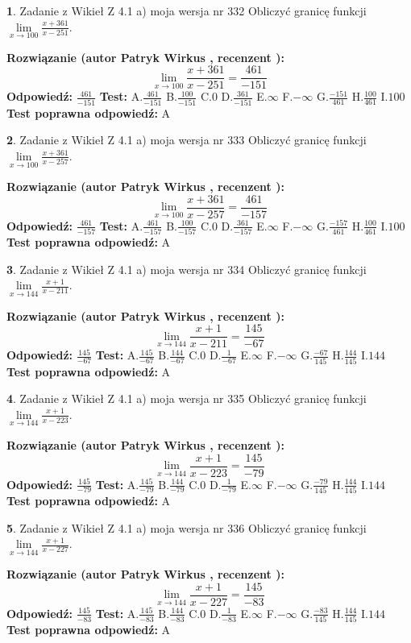 \documentclass[12pt, a4paper]{article}
\theoremstyle{definition} %
\newtheorem{zad}{}
\newcommand{\zadStart}[1]{\begin{zad}#1\newline}
\newcommand{\zadStop}{\end{zad}}
\newcommand{\rozwStart}[2]{\noindent \textbf{Rozwiązanie (autor #1 , recenzent #2): }\newline}
\newcommand{\rozwStop}{\newline}
\newcommand{\odpStart}{\noindent \textbf{Odpowiedź:}\newline}
\newcommand{\odpStop}{\newline}
\newcommand{\testStart}{\noindent \textbf{Test:}\newline}
\newcommand{\testStop}{\newline}
\newcommand{\kluczStart}{\noindent \textbf{Test poprawna odpowiedź:}\newline}
\newcommand{\kluczStop}{\newline}
\begin{document}
\zadStart{Zadanie z Wikieł Z 4.1 a) moja wersja nr 332}
Obliczyć granicę funkcji $\lim\limits_{x\to100}\frac{x+361}{x-251}$.
\zadStop
\rozwStart{Patryk Wirkus}{}
$$\lim\limits_{x\to100}\frac{x+361}{x-251} = \frac{461}{-151}$$
\rozwStop
\odpStart
$\frac{461}{-151}$
\odpStop
\testStart
A.$\frac{461}{-151}$
B.$\frac{100}{-151}$
C.$0$
D.$\frac{361}{-151}$
E.$\infty$
F.$-\infty$
G.$\frac{-151}{461}$
H.$\frac{100}{461}$
I.$100$
\testStop
\kluczStart
A
\kluczStop



\zadStart{Zadanie z Wikieł Z 4.1 a) moja wersja nr 333}
Obliczyć granicę funkcji $\lim\limits_{x\to100}\frac{x+361}{x-257}$.
\zadStop
\rozwStart{Patryk Wirkus}{}
$$\lim\limits_{x\to100}\frac{x+361}{x-257} = \frac{461}{-157}$$
\rozwStop
\odpStart
$\frac{461}{-157}$
\odpStop
\testStart
A.$\frac{461}{-157}$
B.$\frac{100}{-157}$
C.$0$
D.$\frac{361}{-157}$
E.$\infty$
F.$-\infty$
G.$\frac{-157}{461}$
H.$\frac{100}{461}$
I.$100$
\testStop
\kluczStart
A
\kluczStop



\zadStart{Zadanie z Wikieł Z 4.1 a) moja wersja nr 334}
Obliczyć granicę funkcji $\lim\limits_{x\to144}\frac{x+1}{x-211}$.
\zadStop
\rozwStart{Patryk Wirkus}{}
$$\lim\limits_{x\to144}\frac{x+1}{x-211} = \frac{145}{-67}$$
\rozwStop
\odpStart
$\frac{145}{-67}$
\odpStop
\testStart
A.$\frac{145}{-67}$
B.$\frac{144}{-67}$
C.$0$
D.$\frac{1}{-67}$
E.$\infty$
F.$-\infty$
G.$\frac{-67}{145}$
H.$\frac{144}{145}$
I.$144$
\testStop
\kluczStart
A
\kluczStop



\zadStart{Zadanie z Wikieł Z 4.1 a) moja wersja nr 335}
Obliczyć granicę funkcji $\lim\limits_{x\to144}\frac{x+1}{x-223}$.
\zadStop
\rozwStart{Patryk Wirkus}{}
$$\lim\limits_{x\to144}\frac{x+1}{x-223} = \frac{145}{-79}$$
\rozwStop
\odpStart
$\frac{145}{-79}$
\odpStop
\testStart
A.$\frac{145}{-79}$
B.$\frac{144}{-79}$
C.$0$
D.$\frac{1}{-79}$
E.$\infty$
F.$-\infty$
G.$\frac{-79}{145}$
H.$\frac{144}{145}$
I.$144$
\testStop
\kluczStart
A
\kluczStop



\zadStart{Zadanie z Wikieł Z 4.1 a) moja wersja nr 336}
Obliczyć granicę funkcji $\lim\limits_{x\to144}\frac{x+1}{x-227}$.
\zadStop
\rozwStart{Patryk Wirkus}{}
$$\lim\limits_{x\to144}\frac{x+1}{x-227} = \frac{145}{-83}$$
\rozwStop
\odpStart
$\frac{145}{-83}$
\odpStop
\testStart
A.$\frac{145}{-83}$
B.$\frac{144}{-83}$
C.$0$
D.$\frac{1}{-83}$
E.$\infty$
F.$-\infty$
G.$\frac{-83}{145}$
H.$\frac{144}{145}$
I.$144$
\testStop
\kluczStart
A
\kluczStop
\end{document}
